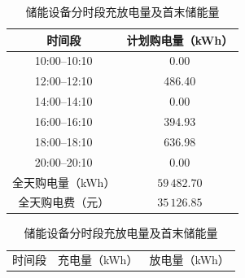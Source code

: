 \begin{table}[htbp]
  \centering


  \begin{minipage}[t]{0.46\textwidth}
    \centering
    \small
    \setlength{\tabcolsep}{5pt}
    \caption{指定时段的计划购电量及全天购电量、购电费}
    \label{tab:q1_purchase}

    \begin{tabular}{cc}
      \toprule

      \rowcolor{headerblue}
      时间段 & 计划购电量（kWh）\\

      \midrule

      10:00--10:10 & 0.00\\

      \rowcolor{rowblue}
      12:00--12:10 & 486.40\\

      14:00--14:10 & 0.00\\

      \rowcolor{rowblue}
      16:00--16:10 & 394.93\\

      18:00--18:10 & 636.98\\

      \rowcolor{rowblue}
      20:00--20:10 & 0.00\\

      \midrule

      全天购电量（kWh） & $59\,482.70$\\

      \rowcolor{rowblue}
      全天购电费（元） & $35\,126.85$\\

      \bottomrule
    \end{tabular}
  \end{minipage}
  \hfill
  \begin{minipage}[t]{0.50\textwidth}
    \centering
    \small
    \setlength{\tabcolsep}{4pt}
    \caption{储能设备分时段充放电量及首末储能量}
    \label{tab:q1_storage}

    \begin{tabular}{ccc}
      \toprule

      \rowcolor{headerblue}
      时间段 & 充电量（kWh） & 放电量（kWh）\\


\end{tabular}
\end{minipage}
\end{table}
